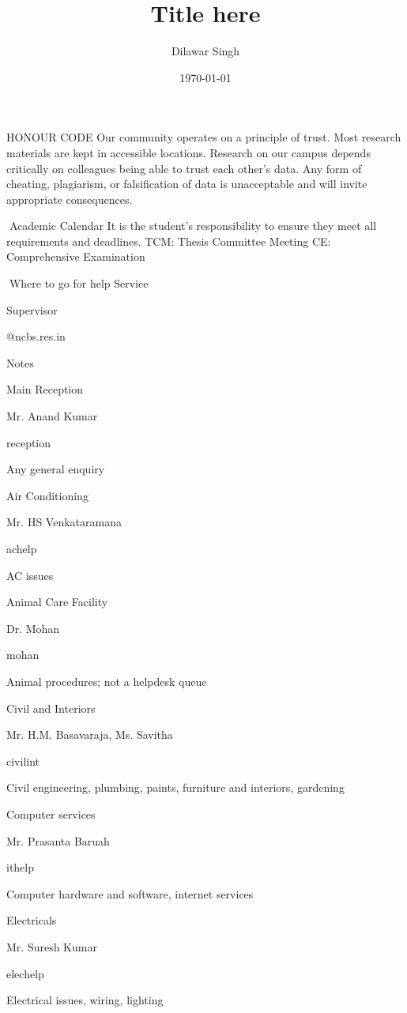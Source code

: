 \documentclass[a4paper,10pt]{article}
\title{Title here}
\author{Dilawar Singh}
\date{\today}
\begin{document}
\maketitle
\begin{abstract}

\end{abstract}

HONOUR CODE
Our community operates on a principle of trust. Most research
materials are kept in accessible locations. Research on our campus
depends critically on colleagues being able to trust each other’s data.
Any form of cheating, plagiarism, or falsification of data is
unacceptable and will invite appropriate consequences.

Academic Calendar
It is the student’s responsibility to ensure they meet all requirements and deadlines.
TCM: Thesis Committee Meeting
CE: Comprehensive Examination

Where to go for help
Service

Supervisor

@ncbs.res.in

Notes

Main
Reception

Mr. Anand Kumar

reception

Any general enquiry

Air
Conditioning

Mr. HS Venkataramana

achelp

AC issues

Animal Care
Facility

Dr. Mohan

mohan

Animal procedures;
not a helpdesk queue

Civil and
Interiors

Mr. H.M. Basavaraja,
Ms. Savitha

civilint

Civil engineering, plumbing, paints,
furniture and interiors, gardening

Computer
services

Mr. Prasanta Baruah

ithelp

Computer hardware and software,
internet services

Electricals

Mr. Suresh Kumar

elechelp

Electrical issues, wiring, lighting
\end{document}
